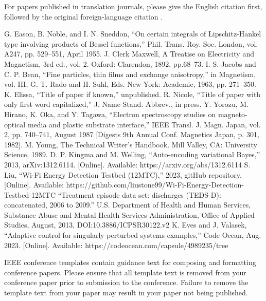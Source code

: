 \documentclass[conference]{IEEEtran}
\theoremstyle{plain}
\theoremstyle{definition}
\theoremstyle{remark}
\begin{document}
For papers published in translation journals, please give the English 
citation first, followed by the original foreign-language citation \cite{b6}.

\begin{thebibliography}{00}
 G. Eason, B. Noble, and I. N. Sneddon, ``On certain integrals of Lipschitz-Hankel type involving products of Bessel functions,'' Phil. Trans. Roy. Soc. London, vol. A247, pp. 529--551, April 1955.
 J. Clerk Maxwell, A Treatise on Electricity and Magnetism, 3rd ed., vol. 2. Oxford: Clarendon, 1892, pp.68--73.
 I. S. Jacobs and C. P. Bean, ``Fine particles, thin films and exchange anisotropy,'' in Magnetism, vol. III, G. T. Rado and H. Suhl, Eds. New York: Academic, 1963, pp. 271--350.
 K. Elissa, ``Title of paper if known,'' unpublished.
 R. Nicole, ``Title of paper with only first word capitalized,'' J. Name Stand. Abbrev., in press.
 Y. Yorozu, M. Hirano, K. Oka, and Y. Tagawa, ``Electron spectroscopy studies on magneto-optical media and plastic substrate interface,'' IEEE Transl. J. Magn. Japan, vol. 2, pp. 740--741, August 1987 [Digests 9th Annual Conf. Magnetics Japan, p. 301, 1982].
 M. Young, The Technical Writer's Handbook. Mill Valley, CA: University Science, 1989.
 D. P. Kingma and M. Welling, ``Auto-encoding variational Bayes,'' 2013, arXiv:1312.6114. [Online]. Available: https://arxiv.org/abs/1312.6114
 S. Liu, ``Wi-Fi Energy Detection Testbed (12MTC),'' 2023, gitHub repository. [Online]. Available: https://github.com/liustone99/Wi-Fi-Energy-Detection-Testbed-12MTC
 ``Treatment episode data set: discharges (TEDS-D): concatenated, 2006 to 2009.'' U.S. Department of Health and Human Services, Substance Abuse and Mental Health Services Administration, Office of Applied Studies, August, 2013, DOI:10.3886/ICPSR30122.v2
 K. Eves and J. Valasek, ``Adaptive control for singularly perturbed systems examples,'' Code Ocean, Aug. 2023. [Online]. Available: https://codeocean.com/capsule/4989235/tree
\end{thebibliography}

\vspace{12pt}
\color{red}
IEEE conference templates contain guidance text for composing and formatting conference papers. Please ensure that all template text is removed from your conference paper prior to submission to the conference. Failure to remove the template text from your paper may result in your paper not being published.
\end{document}
